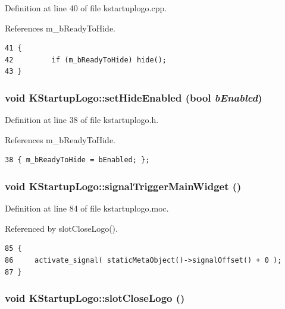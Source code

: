 Definition at line 40 of file kstartuplogo.cpp.

References m\_\-b\-Ready\-To\-Hide.



\footnotesize\begin{verbatim}41 {
42         if (m_bReadyToHide) hide();
43 }
\end{verbatim}\normalsize 
{}
\subsubsection{\setlength{\rightskip}{0pt plus 5cm}void KStartup\-Logo::set\-Hide\-Enabled (bool {\em b\-Enabled})\hspace{0.3cm}{\tt  [inline]}}\label{classKStartupLogo_KStartupLogoa2}




Definition at line 38 of file kstartuplogo.h.

References m\_\-b\-Ready\-To\-Hide.



\footnotesize\begin{verbatim}38 { m_bReadyToHide = bEnabled; };
\end{verbatim}\normalsize 
{}
\subsubsection{\setlength{\rightskip}{0pt plus 5cm}void KStartup\-Logo::signal\-Trigger\-Main\-Widget ()\hspace{0.3cm}{\tt  [signal]}}\label{classKStartupLogo_KStartupLogol0}




Definition at line 84 of file kstartuplogo.moc.

Referenced by slot\-Close\-Logo().



\footnotesize\begin{verbatim}85 {
86     activate_signal( staticMetaObject()->signalOffset() + 0 );
87 }
\end{verbatim}\normalsize 
{}
\subsubsection{\setlength{\rightskip}{0pt plus 5cm}void KStartup\-Logo::slot\-Close\-Logo ()\hspace{0.3cm}{\tt  [slot]}}\label{classKStartupLogo_KStartupLogoi0}




